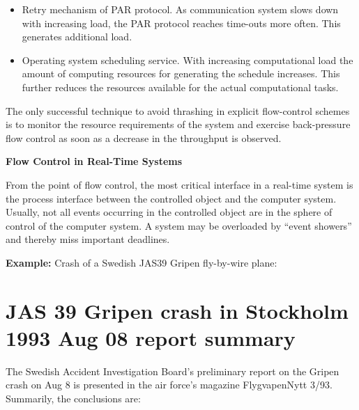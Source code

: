 \begin{itemize}
\item
  Retry mechanism of PAR protocol. As communication system slows down
  with increasing load, the PAR protocol reaches time-outs more often.
  This generates additional load.
\item
  Operating system scheduling service. With increasing computational
  load the amount of computing resources for generating the schedule
  increases. This further reduces the resources available for the actual
  computational tasks.
\end{itemize}

The only successful technique to avoid thrashing in explicit
flow-control schemes is to monitor the resource requirements of the
system and exercise back-pressure flow control as soon as a decrease in
the throughput is observed.

\textbf{Flow Control in Real-Time Systems}

From the point of flow control, the most critical interface in a
real-time system is the process interface between the controlled object
and the computer system. Usually, not all events occurring in the
controlled object are in the sphere of control of the computer system. A
system may be overloaded by ``event showers'' and thereby miss important
deadlines.

\textbf{Example:} Crash of a Swedish JAS39 Gripen fly-by-wire plane:

\section{JAS 39 Gripen crash in Stockholm 1993 Aug 08 report
summary}\label{jas-39-gripen-crash-in-stockholm-1993-aug-08-report-summary}

The Swedish Accident Investigation Board's preliminary report on the
Gripen crash on Aug 8 is presented in the air force's magazine
FlygvapenNytt 3/93. Summarily, the conclusions are:

